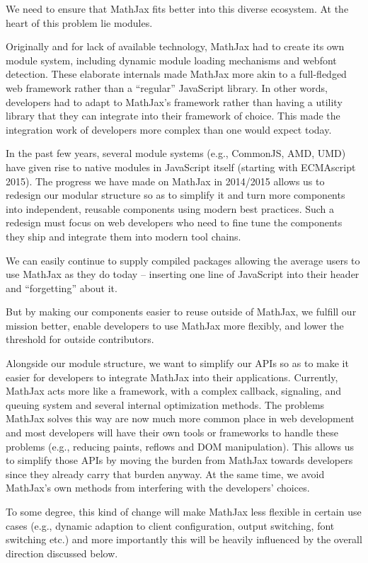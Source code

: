 \documentclass[]{amsart}
\begin{document}
We need to ensure that MathJax fits better into this diverse ecosystem.
At the heart of this problem lie modules.

Originally and for lack of available technology, MathJax had to create
its own module system, including dynamic module loading mechanisms and
webfont detection. These elaborate internals made MathJax more akin to a
full-fledged web framework rather than a ``regular'' JavaScript library.
In other words, developers had to adapt to MathJax's framework rather
than having a utility library that they can integrate into their
framework of choice. This made the integration work of developers more
complex than one would expect today.

In the past few years, several module systems (e.g., CommonJS, AMD, UMD)
have given rise to native modules in JavaScript itself (starting with
ECMAscript 2015). The progress we have made on MathJax in 2014/2015
allows us to redesign our modular structure so as to simplify it and
turn more components into independent, reusable components using modern
best practices. Such a redesign must focus on web developers who need to
fine tune the components they ship and integrate them into modern tool
chains.

We can easily continue to supply compiled packages allowing the average
users to use MathJax as they do today -- inserting one line of
JavaScript into their header and ``forgetting'' about it.

But by making our components easier to reuse outside of MathJax, we
fulfill our mission better, enable developers to use MathJax more
flexibly, and lower the threshold for outside contributors.

Alongside our module structure, we want to simplify our APIs so as to
make it easier for developers to integrate MathJax into their
applications. Currently, MathJax acts more like a framework, with a
complex callback, signaling, and queuing system and several internal
optimization methods. The problems MathJax solves this way are now much
more common place in web development and most developers will have their
own tools or frameworks to handle these problems (e.g., reducing paints,
reflows and DOM manipulation). This allows us to simplify those APIs by
moving the burden from MathJax towards developers since they already
carry that burden anyway. At the same time, we avoid MathJax's own
methods from interfering with the developers' choices.

To some degree, this kind of change will make MathJax less flexible in
certain use cases (e.g., dynamic adaption to client configuration,
output switching, font switching etc.) and more importantly this will be
heavily influenced by the overall direction discussed below.
\end{document}
